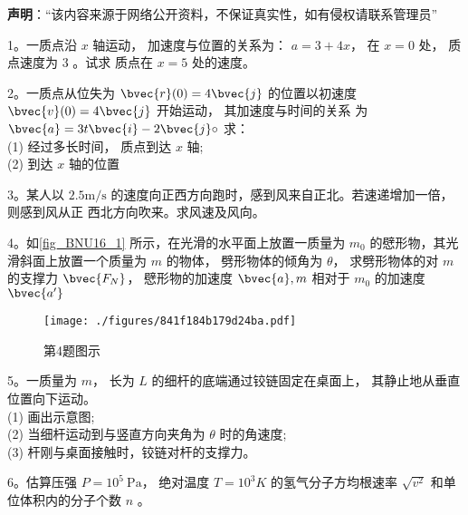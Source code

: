 
\textbf{声明}：“该内容来源于网络公开资料，不保证真实性，如有侵权请联系管理员”

1。一质点沿 $x$ 轴运动， 加速度与位置的关系为： $a=3+4 x$， 在 $x=0$ 处， 质点速度为 3 。试求 质点在 $x=5$ 处的速度。

2。一质点从位失为 $\bvec{r}(0)=4 \bvec{j}$ 的位置以初速度 $\bvec{v}(0)=4 \bvec{j}$ 开始运动， 其加速度与时间的关系 为 $\bvec{a}=3 t \bvec{i}-2 \bvec{j} \circ$ 求：\\
(1) 经过多长时间， 质点到达 $x$ 轴;\\
(2) 到达 $x$ 轴的位置

3。某人以 $2.5 \mathrm{m / s}$ 的速度向正西方向跑时，感到风来自正北。若速递增加一倍， 则感到风从正 西北方向吹来。求风速及风向。

4。如\autoref{fig_BNU16_1} 所示，在光滑的水平面上放置一质量为 $m_{0}$ 的憵形物，其光滑斜面上放置一个质量为 $m$ 的物体， 劈形物体的倾角为 $\theta$， 求劈形物体的对 $m$ 的支撑力 $\bvec{F_{N}}$， 憵形物的加速度 $\bvec{a}, m$ 相对于 $m_{0}$ 的加速度 $\bvec{a^{\prime}}$
\begin{figure}[ht]
\centering
\texttt{[image: ./figures/841f184b179d24ba.pdf]}
\caption{第4题图示} \label{fig_BNU16_1}
\end{figure}
5。一质量为 $m$， 长为 $L$ 的细杆的底端通过铰链固定在桌面上， 其静止地从垂直位置向下运动。\\
(1) 画出示意图;\\
(2) 当细杆运动到与竖直方向夹角为 $\theta$ 时的角速度;\\
(3) 杆刚与桌面接触时，铰链对杆的支撑力。

6。估算压强 $P=10^{5} \mathrm{~Pa}$， 绝对温度 $T=10^{3} K$ 的氢气分子方均根速率 $\sqrt{v^{2}}$ 和单位体积内的分子个数 $n$ 。


